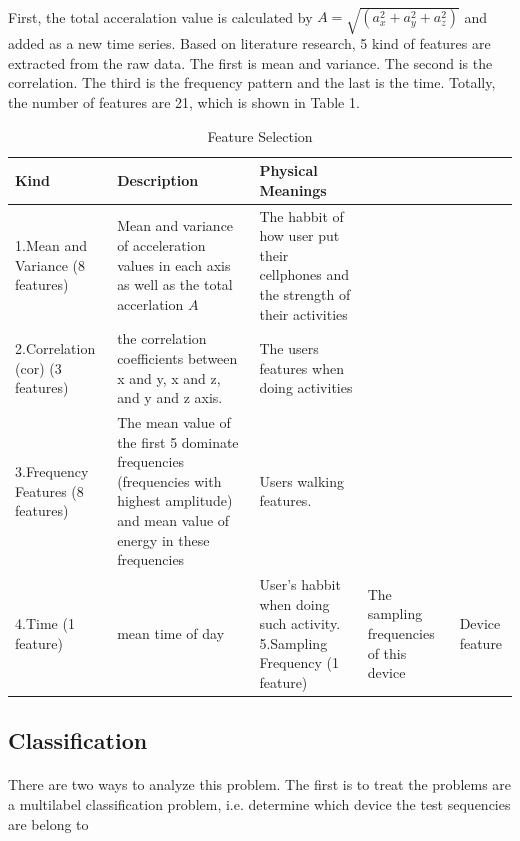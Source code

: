\documentclass{article}
\begin{document}
		\paragraph{}First, the total acceralation value is calculated by $A=\sqrt{(a_x^2+a_y^2+a_z^2)}$ and added as a new time series. Based on literature research, 5 kind of features are extracted from the raw data. The first is mean and variance. The second is the correlation. The third is the frequency pattern and the last is the time. Totally, the number of features are 21, which is shown in Table 1. 
		\begin{table}
			\centering
			\caption{Feature Selection}
			\begin{tabular}{p{3cm}|p{6cm}|p{4cm}}
			Kind & Description & Physical Meanings \\ \hline
			1.Mean and Variance (8 features) & Mean and variance of acceleration values in each axis as well as the total accerlation $A$ & The habbit of how user put their cellphones and the strength of their activities \\ \hline
			2.Correlation (cor) (3 features) & the correlation coefficients between x and y, x and z, and y and z axis. & The users features when doing activities \\ \hline
			3.Frequency Features (8 features) & The mean value of the first 5 dominate frequencies (frequencies with highest amplitude) and mean value of energy in these frequencies & Users walking features.\\ \hline
			4.Time (1 feature) & mean time of day & User's habbit when doing such activity.
			5.Sampling Frequency (1 feature) & The sampling frequencies of this device & Device feature
			\end{tabular}
		\end{table}

	
		\subsection{Classification} %
		\label{sub:classifier}
		\paragraph{} There are two ways to analyze this problem. The first is to treat the problems are a multilabel classification problem, i.e. determine which device the test sequencies are belong to 
	
\end{document}
